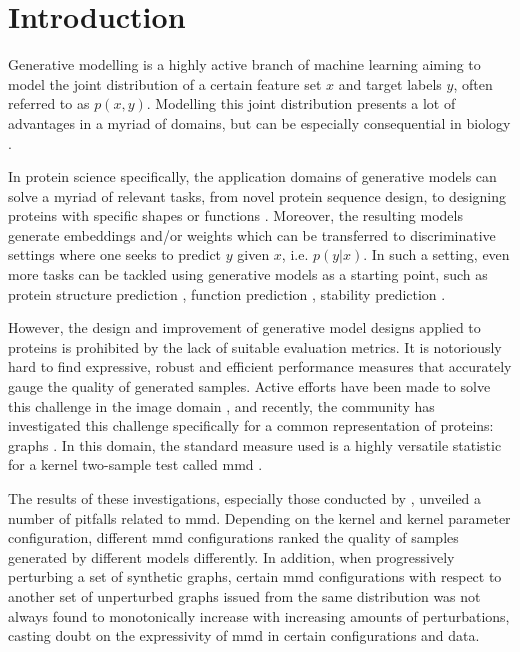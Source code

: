 \chapter{Introduction}


Generative modelling is a highly active branch of machine learning aiming to
model the joint distribution of a certain feature set $x$ and target labels $y$,
often referred to as $p(x,y)$. Modelling this joint distribution presents a lot
of advantages in a myriad of domains, but can be especially
consequential in biology \citep{lopez2020enhancing,strokach2022deep}.

In protein science specifically, the application domains of generative models
can solve a myriad of relevant tasks, from novel protein sequence design, to
designing proteins with specific shapes or functions
\citep{jendrusch2021alphadesign,madani2021deep}. Moreover, the resulting models generate
embeddings and/or weights which can be transferred to discriminative settings
where one seeks to predict $y$ given $x$, i.e. $p(y|x)$. In such a setting, even
more tasks can be tackled using generative models as a starting point, such as protein
structure prediction \citep{jumper2021highly}, function prediction
\citep{meier2021language}, stability prediction \citep{strokach2020fast}.

However, the design and improvement of generative model designs applied to
proteins is prohibited by the lack of suitable evaluation metrics. It is
notoriously hard to find expressive, robust and efficient performance measures
that accurately gauge the quality of generated samples. Active efforts have been
made to solve this challenge in the image domain \citep{heusel2017gans}, and
recently, the community has investigated this challenge specifically for a
common representation of proteins: graphs \citep{thompson2022evaluation,
o2021evaluation}. In this domain, the standard measure used is a highly
versatile statistic for a kernel two-sample test called \acrfull{mmd}
\citep{gretton2012kernel}.

The results of these investigations, especially those conducted by
\cite{o2021evaluation}, unveiled a number of pitfalls related to \acrshort{mmd}. Depending
on the kernel and kernel parameter configuration, different \acrshort{mmd} configurations
ranked the quality of samples generated by different models differently. In
addition, when progressively perturbing a set of synthetic graphs, certain \acrshort{mmd}
configurations with respect to another set of unperturbed graphs issued from the
same distribution was not always found to monotonically increase with increasing
amounts of perturbations, casting doubt on the expressivity of \acrshort{mmd} in certain
configurations and data.

